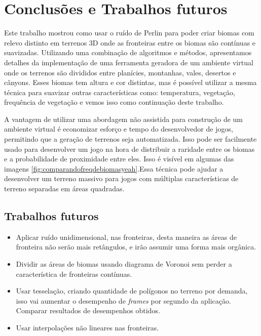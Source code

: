\chapter{Conclusões e Trabalhos futuros}

Este trabalho mostrou como usar
o ruído de Perlin para poder criar biomas com relevo distinto em terrenos 3D onde as fronteiras entre os biomas são contínuas e suavizadas.
Utilizando uma combinação de algoritmos e métodos, apresentamos detalhes da implementação de uma ferramenta geradora de um ambiente virtual onde os 
terrenos são divididos entre planícies, montanhas, vales, desertos e cânyons. 
Esses biomas tem altura e cor distintas, mas é possível utilizar a mesma técnica para suavizar
outras características como: temperatura, vegetação, frequência de vegetação e vemos isso como continuação deste trabalho. 

A vantagem de utilizar uma abordagem não assistida para construção de um ambiente virtual é economizar esforço e tempo do desenvolvedor de jogos,
permitindo que a geração de terrenos seja automatizada.  
Isso pode ser facilmente usado para desenvolver um jogo na hora de distribuir 
a raridade entre os biomas e a probabilidade de proximidade entre eles. Isso é visível em
algumas das imagens \ref{fig:comparandofreqdebiomasyeah}.Essa técnica pode ajudar a desenvolver um terreno massivo para jogos com
múltiplas características de terreno separadas em áreas quadradas.



\section{Trabalhos futuros}

\begin{itemize}
    \item Aplicar ruído unidimensional, nas fronteiras, desta maneira as áreas de fronteira
    não serão mais retângulos, e irão assumir uma forma mais orgânica.
    \item Dividir as áreas de biomas usando diagrama de Voronoi sem perder a característica de fronteiras contínuas.
    \item Usar tesselação, criando quantidade de polígonos no terreno por demanda, 
    isso vai aumentar o desempenho de \textit{frames} por segundo da aplicação. 
    Comparar resultados de desempenhos obtidos.
    \item Usar interpolações não lineares nas fronteiras.
    
\end{itemize}